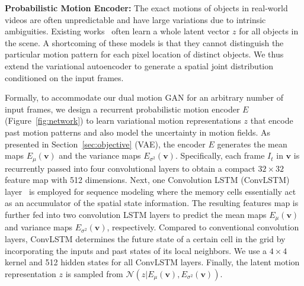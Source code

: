 \documentclass[10pt,twocolumn,letterpaper]{article}
\begin{document}
	\textbf{Probabilistic Motion Encoder:}
	\label{sec:encoder}
	The exact motions of objects in real-world videos are often unpredictable and have large variations due to intrinsic ambiguities. Existing works~\cite{xue2016visual,walker2016uncertain,kingma2013auto,goyal2017nonparametric} often learn a whole latent vector $z$ for all objects in the scene. A shortcoming of these models is that they cannot distinguish the particular motion pattern for each pixel location of distinct objects. We thus extend the variational autoencoder to generate a spatial joint distribution conditioned on the input frames. 
	
	Formally, to accommodate our dual motion GAN for an arbitrary number of input frames, we design a recurrent probabilistic motion encoder $E$ (Figure~\ref{fig:network}) to learn variational motion representations $z$ that encode past motion patterns and also model the uncertainty in motion fields. As presented in Section~\ref{sec:objective} (VAE), the encoder $E$ generates the mean maps $E_\mu(\mathbf{v})$ and the variance maps $E_{\sigma^2}(\mathbf{v})$. Specifically, each frame $I_t$ in $\mathbf{v}$ is recurrently passed into four convolutional layers to obtain a compact $32\times 32 $ feature map with 512 dimensions. Next, one Convolution LSTM (ConvLSTM) layer~\cite{hochreiter1997long,xingjian2015convolutional,liang2017interpretable} is employed for sequence modeling where the memory cells essentially act as an accumulator of the spatial state information. The resulting features map is further fed into two convolution LSTM layers to predict the mean maps $E_\mu(\mathbf{v})$ and variance maps $E_{\sigma^2}(\mathbf{v})$, respectively. Compared to conventional convolution layers, ConvLSTM determines the future state of a certain cell in the grid by incorporating the inputs and past states of its local neighbors. We use a $4\times4$ kernel and 512 hidden states for all ConvLSTM layers. Finally, the latent motion representation $z$ is sampled from $\mathcal{N}(z|E_\mu(\mathbf{v}), E_{\sigma^2}(\mathbf{v}))$.
	
\end{document}

